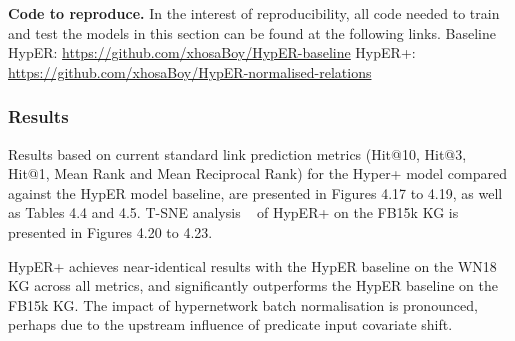 \noindent \textbf{Code to reproduce.} In the interest of reproducibility, all code needed to train and test the models in this section can be found at the following links. \newline
Baseline HypER: \url{https://github.com/xhosaBoy/HypER-baseline} \newline
HypER+: \url{https://github.com/xhosaBoy/HypER-normalised-relations} 

\subsubsection{Results}
Results based on current standard link prediction metrics (Hit@10, Hit@3, Hit@1, Mean Rank and Mean Reciprocal Rank) for the Hyper+ model compared against the HypER model baseline, are presented in Figures 4.17 to 4.19, as well as Tables 4.4 and 4.5. T-SNE analysis \unskip ~\citep{maaten2008visualizing} of HypER+ on the FB15k KG is presented in Figures 4.20 to 4.23. \par

\noindent HypER+ achieves near-identical results with the HypER baseline on the WN18 KG across all metrics, and significantly outperforms the HypER baseline on the FB15k KG. The impact of hypernetwork batch normalisation is pronounced, perhaps due to the upstream influence of predicate input covariate shift. 

\bigskip
\bigskip



